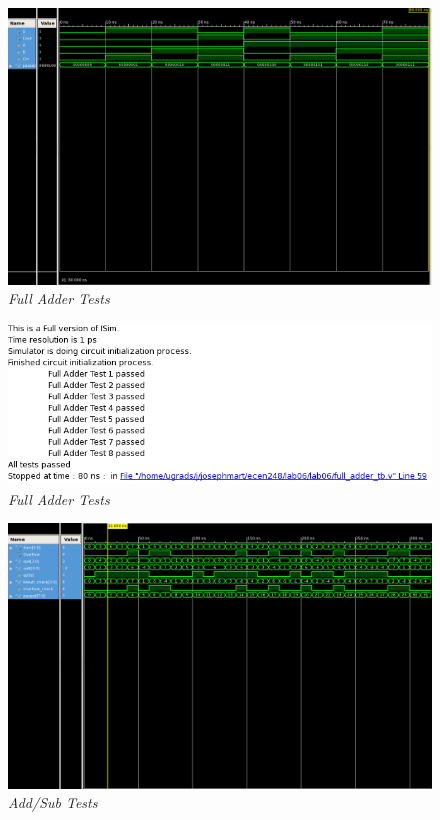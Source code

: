 \documentclass[a4paper,12pt]{article}
\begin{document}
\newpage

\begin{figure}[h]
  \begin{center}
    \includegraphics[scale=0.6]{FullAdderPlots.png}
    \caption{\textit{Full Adder Tests}}
  \end{center}
\end{figure}

\begin{figure}[h]
  \begin{center}
    \includegraphics[scale=0.65]{FullAdderTests.png}
    \caption{\textit{Full Adder Tests}}
  \end{center}
\end{figure}

\newpage

\begin{figure}[h]
  \begin{center}
    \includegraphics[scale=0.4]{Add_SubPlot.png}
    \caption{\textit{Add/Sub Tests}}
  \end{center}
\end{figure}
\end{document}
